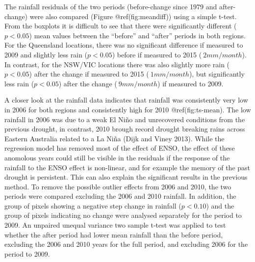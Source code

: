 \documentclass[fleqn,10pt,lineno]{wlpeerj} %
\begin{document}
The rainfall residuals of the two periods (before-change since 1979 and
after-change) were also compared (Figure @ref(fig:meandiff)) using a
simple t-test. From the boxplots it is difficult to see that there were
significantly different (\(p < 0.05\)) mean values between the
``before'' and ``after'' periods in both regions. For the Queensland
locations, there was no significant difference if measured to 2009 and
slightly less rain (\(p < 0.05\)) before if measured to 2015
(\(~ 2 mm/month\)). In contrast, for the NSW/VIC locations there was
also slightly more rain (\(p < 0.05\)) after the change if measured to
2015 (\(~ 1 mm/month\)), but significantly less rain (\(p < 0.05\))
after the change (\(~ 9 mm/month\)) if measured to 2009.

A closer look at the rainfall data indicates that rainfall was
consistently very low in 2006 for both regions and consistently high for
2010 @ref(fig:ts-mean). The low rainfall in 2006 was due to a weak El
Niño and unrecovered conditions from the previous drought, in contrast,
2010 brough record drought breaking rains across Eastern Australia
related to a La Niña (Dijk and Viney 2013). While the regression model
has removed most of the effect of ENSO, the effect of these anomolous
years could still be visible in the residuals if the response of the
rainfall to the ENSO effect is non-linear, and for example the memory of
the past drought is persistent. This can also explain the significant
results in the previous method. To remove the possible outlier effects
from 2006 and 2010, the two periods were compared excluding the 2006 and
2010 rainfall. In addition, the group of pixels showing a negative step
change in rainfall (\(p < 0.10\)) and the group of pixels indicating no
change were analysed separately for the period to 2009. An unpaired
unequal variance two sample t-test was applied to test whether the after
period had lower mean rainfall than the before period, excluding the
2006 and 2010 years for the full period, and excluding 2006 for the
period to 2009.
\end{document}
